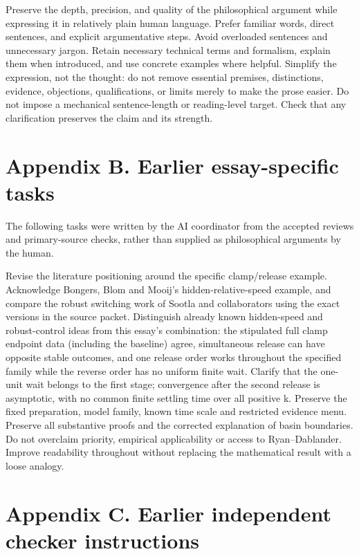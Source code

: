 Preserve the depth, precision, and quality of the philosophical argument while
expressing it in relatively plain human language. Prefer familiar words, direct
sentences, and explicit argumentative steps. Avoid overloaded sentences and
unnecessary jargon. Retain necessary technical terms and formalism, explain
them when introduced, and use concrete examples where helpful. Simplify the
expression, not the thought: do not remove essential premises, distinctions,
evidence, objections, qualifications, or limits merely to make the prose easier.
Do not impose a mechanical sentence-length or reading-level target. Check that
any clarification preserves the claim and its strength.

\section*{Appendix B. Earlier essay-specific tasks}

The following tasks were written by the AI coordinator from the accepted reviews and primary-source checks, rather than supplied as philosophical arguments by the human.

Revise the literature positioning around the specific clamp/release example. Acknowledge Bongers, Blom and Mooij's hidden-relative-speed example, and compare the robust switching work of Sootla and collaborators using the exact versions in the source packet. Distinguish already known hidden-speed and robust-control ideas from this essay's combination: the stipulated full clamp endpoint data (including the baseline) agree, simultaneous release can have opposite stable outcomes, and one release order works throughout the specified family while the reverse order has no uniform finite wait.
Clarify that the one-unit wait belongs to the first stage; convergence after the second release is asymptotic, with no common finite settling time over all positive k. Preserve the fixed preparation, model family, known time scale and restricted evidence menu. Preserve all substantive proofs and the corrected explanation of basin boundaries. Do not overclaim priority, empirical applicability or access to Ryan–Dablander. Improve readability throughout without replacing the mathematical result with a loose analogy.

\section*{Appendix C. Earlier independent checker instructions}

